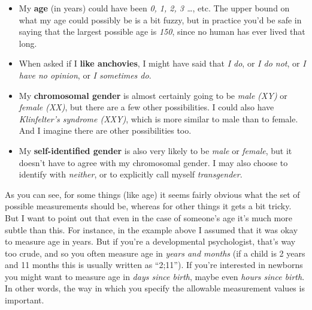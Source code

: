 \documentclass[
]{book}
\providecommand{\tightlist}{%
  \setlength{\itemsep}{0pt}\setlength{\parskip}{0pt}}
\begin{document}
\begin{itemize}
\tightlist
\item
  My \textbf{age} (in years) could have been \emph{0, 1, 2, 3 \ldots{}}, etc. The upper bound on what my age could possibly be is a bit fuzzy, but in practice you'd be safe in saying that the largest possible age is \emph{150}, since no human has ever lived that long.
\item
  When asked if I \textbf{like anchovies}, I might have said that \emph{I do}, or \emph{I do not}, or \emph{I have no opinion}, or \emph{I sometimes do}.
\item
  My \textbf{chromosomal gender} is almost certainly going to be \emph{male (XY)} or \emph{female (XX)}, but there are a few other possibilities. I could also have \emph{Klinfelter's syndrome (XXY)}, which is more similar to male than to female. And I imagine there are other possibilities too.
\item
  My \textbf{self-identified gender} is also very likely to be \emph{male} or \emph{female}, but it doesn't have to agree with my chromosomal gender. I may also choose to identify with \emph{neither}, or to explicitly call myself \emph{transgender}.
\end{itemize}

As you can see, for some things (like age) it seems fairly obvious what the set of possible measurements should be, whereas for other things it gets a bit tricky. But I want to point out that even in the case of someone's age it's much more subtle than this. For instance, in the example above I assumed that it was okay to measure age in years. But if you're a developmental psychologist, that's way too crude, and so you often measure age in \emph{years and months} (if a child is 2 years and 11 months this is usually written as ``2;11''). If you're interested in newborns you might want to measure age in \emph{days since birth}, maybe even \emph{hours since birth}. In other words, the way in which you specify the allowable measurement values is important.
\end{document}
